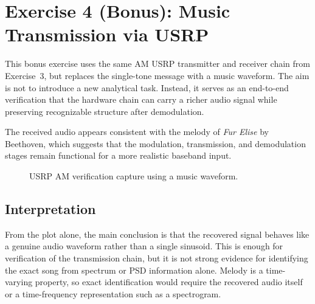 \section{Exercise 4 (Bonus): Music Transmission via USRP}
\label{sec:lab2_ex4_bonus}

This bonus exercise uses the same AM USRP transmitter and receiver chain from
Exercise~3, but replaces the single-tone message with a music waveform. The aim
is not to introduce a new analytical task. Instead, it serves as an end-to-end
verification that the hardware chain can carry a richer audio signal while
preserving recognizable structure after demodulation.

The received audio appears consistent with the melody of \emph{Fur Elise} by
Beethoven, which suggests that the modulation, transmission, and demodulation
stages remain functional for a more realistic baseband input.

\begin{figure}[H]
\centering
{}
\caption{USRP AM verification capture using a music waveform.}
\label{fig:lab2_ex4_music}
\end{figure}

\subsection{Interpretation}

From the plot alone, the main conclusion is that the recovered signal behaves
like a genuine audio waveform rather than a single sinusoid. This is enough for
verification of the transmission chain, but it is not strong evidence for
identifying the exact song from spectrum or PSD information alone. Melody is a
time-varying property, so exact identification would require the recovered audio
itself or a time-frequency representation such as a spectrogram.
